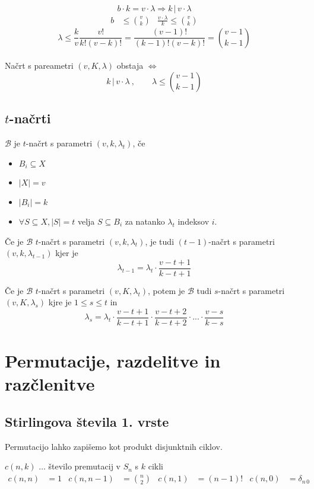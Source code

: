 \documentclass[11pt,a4paper]{article}
\begin{document}
\[b\cdot k = v\cdot \lambda \Rightarrow k\, |\, v \cdot \lambda \]
\begin{align*}
    b &\leq \binom{v}{k} & \frac{v\cdot \lambda}{k} \leq \binom{v}{k}
\end{align*}
\[\lambda \leq \frac{k}{v}\frac{v!}{k!(v-k)!} = \frac{(v-1)!}{(k-1)!(v-k)!} = \binom{v-1}{k-1}\]
\\

Načrt s pareametri $(v,K,\lambda)$ obstaja $\Leftrightarrow$
\[k\,|\,v\cdot \lambda\ , \qquad \lambda \leq \binom{v-1}{k-1}\]

\subsection*{$t$-načrti}

$\mathcal{B}$ je $t$-načrt s parametri $(v,k,\lambda_t)$, če 
\begin{itemize}
    \item $B_i \subseteq X$
    \item $|X| = v$
    \item $|B_i| = k$
    \item $\forall S \subseteq X, |S| = t$ velja $S\subseteq B_i$ za natanko $\lambda_t$ indeksov $i$.
\end{itemize}

Če je $\mathcal{B}$ $t$-načrt s parametri $(v,k,\lambda_t)$, 
je tudi $(t-1)$-načrt s parametri $(v,k,\lambda_{t-1})$
kjer je
\[\lambda_{t-1} = \lambda_{t}\cdot \frac{v-t+1}{k-t+1}\]

Če je $\mathcal{B}$ $t$-načrt s parametri $(v,K,\lambda_t)$, potem je $\mathcal{B}$ tudi $s$-načrt s parametri $(v,K,\lambda_s)$ kjre je $1\leq s \leq t$ in
\[\lambda_s = \lambda_t\cdot \frac{v-t+1}{k-t+1}\cdot\frac{v-t+2}{k-t+2}\cdot...\cdot\frac{v-s}{k-s}\]

\section*{Permutacije, razdelitve in razčlenitve}
\subsection*{Stirlingova števila 1. vrste}
Permutacijo lahko zapišemo kot produkt disjunktnih ciklov.

$c(n,k)$ $\dots$ število premutacij v $S_n$ s $k$ cikli
\begin{align*}
    c(n,n) &= 1 & c(n,n-1) &= \binom{n}{2} & c(n,1) &= (n-1)! & c(n,0) &= \delta_{n\,0} 
\end{align*}
\end{document}
